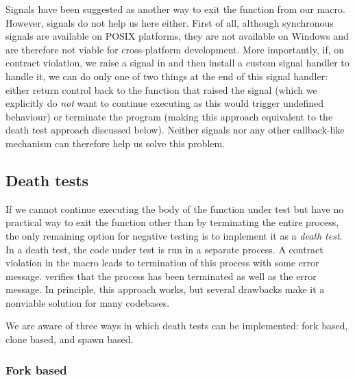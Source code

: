 Signals have been suggested as another way to exit the function from our  macro. However, signals do not help us here either. First of all, although synchronous signals are available on POSIX platforms, they are not available on Windows and are therefore not viable for cross-platform development. More importantly, if, on contract violation, we raise a signal in  and then install a custom signal handler to handle it, we can do only one of two things at the end of this signal handler: either return control back to the function that raised the signal (which we explicitly do \emph{not} want to continue executing as this would trigger undefined behaviour) or terminate the program (making this approach equivalent to the death test approach discussed below). Neither signals nor any other callback-like mechanism can therefore help us solve this problem.

\subsection{Death tests}
\label{subsec:deathtests}

If we cannot continue executing the body of the function under test but have no practical way to exit the function other than by terminating the entire process, the only remaining option for negative testing is to implement it as a \emph{death test}. In a death test, the code under test is run in a separate process. A contract violation in the  macro leads to termination of this process with some error message.  verifies that the process has been terminated as well as the error message. %
In principle, this approach works, but several drawbacks make it a nonviable solution for many codebases.

We are aware of three ways in which death tests can be implemented: fork based, clone based, and spawn based. %

\subsubsection{Fork based}

